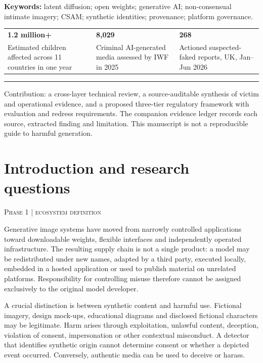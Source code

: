 \documentclass[10pt,a4paper]{article}
\newcommand{\sect}[2]{\Needspace{6\baselineskip}\section{#1}\textcolor{muted}{\small\textsc{#2}}\par\vspace{2mm}}
\begin{document}
\textbf{Keywords:} latent diffusion; open weights; generative AI; non-consensual intimate imagery; CSAM; synthetic identities; provenance; platform governance.\par
\vspace{3mm}
\noindent\begin{tabularx}{\linewidth}{@{}YYY@{}}
{\color{ink}\Large\bfseries 1.2 million+} & {\color{ink}\Large\bfseries 8,029} & {\color{ink}\Large\bfseries 268}\\
\small Estimated children affected across 11 countries in one year & \small Criminal AI-generated media assessed by IWF in 2025 & \small Actioned suspected-faked reports, UK, Jan--Jun 2026\\
\end{tabularx}
\par{}\par
\vspace{1mm}\rule{\linewidth}{0.4pt}

Contribution: a cross-layer technical review, a source-auditable synthesis of victim and operational evidence, and a proposed three-tier regulatory framework with evaluation and redress requirements. The companion evidence ledger records each source, extracted finding and limitation. This manuscript is not a reproducible guide to harmful generation.


\clearpage\sect{Introduction and research questions}{Phase 1 | ecosystem definition}

Generative image systems have moved from narrowly controlled applications toward downloadable weights, flexible interfaces and independently operated infrastructure. The resulting supply chain is not a single product: a model may be redistributed under new names, adapted by a third party, executed locally, embedded in a hosted application or used to publish material on unrelated platforms. Responsibility for controlling misuse therefore cannot be assigned exclusively to the original model developer.


A crucial distinction is between synthetic content and harmful use. Fictional imagery, design mock-ups, educational diagrams and disclosed fictional characters may be legitimate. Harm arises through exploitation, unlawful content, deception, violation of consent, impersonation or other contextual misconduct. A detector that identifies synthetic origin cannot determine consent or whether a depicted event occurred. Conversely, authentic media can be used to deceive or harass. \cite{nist,fbi}
\end{document}
